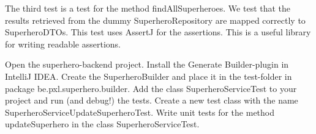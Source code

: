 The third test is a test for the method findAllSuperheroes.  We test that the results retrieved from the dummy SuperheroRepository are mapped correctly to SuperheroDTOs.  This test uses AssertJ for the assertions. This is a useful library for writing readable assertions. 
 
 \begin{oefening}
 Open the superhero-backend project.
Install the Generate Builder-plugin in IntelliJ IDEA. 
Create the SuperheroBuilder and place it in the test-folder in package be.pxl.superhero.builder.
Add the class SuperheroServiceTest to your project and run (and debug!) the tests. 
Create a new test class with the name SuperheroServiceUpdateSuperheroTest.
Write unit tests for the method updateSuperhero in the class SuperheroServiceTest. 
\end{oefening}
 
 
 
 
 
 
